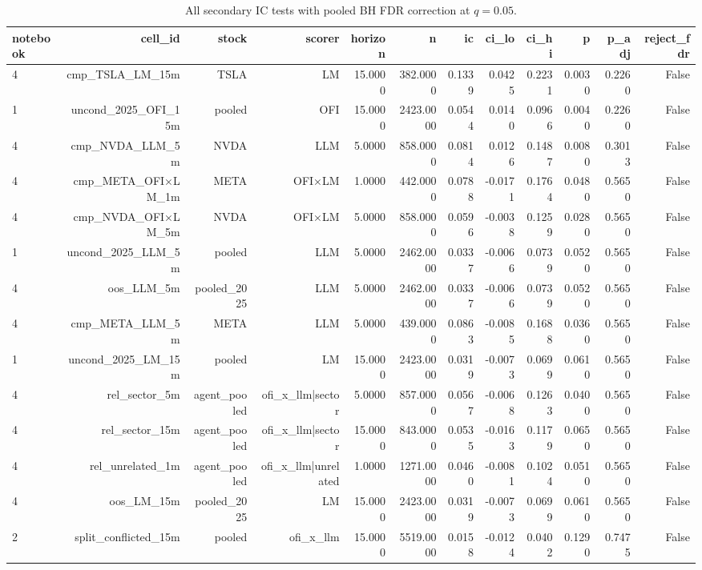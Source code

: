 \begin{table}[htbp]
\centering
\caption{All secondary IC tests with pooled BH FDR correction at $q=0.05$.}
\label{tab:secondary_fdr}
\begin{tabular}{lrrrrrrrrrrr}
\toprule
notebook & cell\_id & stock & scorer & horizon & n & ic & ci\_lo & ci\_hi & p & p\_adj & reject\_fdr \\
\midrule
4 & cmp\_TSLA\_LM\_15m & TSLA & LM & 15.0000 & 382.0000 & 0.1339 & 0.0425 & 0.2231 & 0.0030 & 0.2260 & False \\
1 & uncond\_2025\_OFI\_15m & pooled & OFI & 15.0000 & 2423.0000 & 0.0544 & 0.0140 & 0.0966 & 0.0040 & 0.2260 & False \\
4 & cmp\_NVDA\_LLM\_5m & NVDA & LLM & 5.0000 & 858.0000 & 0.0814 & 0.0126 & 0.1487 & 0.0080 & 0.3013 & False \\
4 & cmp\_META\_OFI×LM\_1m & META & OFI×LM & 1.0000 & 442.0000 & 0.0788 & -0.0171 & 0.1764 & 0.0480 & 0.5650 & False \\
4 & cmp\_NVDA\_OFI×LM\_5m & NVDA & OFI×LM & 5.0000 & 858.0000 & 0.0596 & -0.0038 & 0.1259 & 0.0280 & 0.5650 & False \\
1 & uncond\_2025\_LLM\_5m & pooled & LLM & 5.0000 & 2462.0000 & 0.0337 & -0.0066 & 0.0739 & 0.0520 & 0.5650 & False \\
4 & oos\_LLM\_5m & pooled\_2025 & LLM & 5.0000 & 2462.0000 & 0.0337 & -0.0066 & 0.0739 & 0.0520 & 0.5650 & False \\
4 & cmp\_META\_LLM\_5m & META & LLM & 5.0000 & 439.0000 & 0.0863 & -0.0085 & 0.1688 & 0.0360 & 0.5650 & False \\
1 & uncond\_2025\_LM\_15m & pooled & LM & 15.0000 & 2423.0000 & 0.0319 & -0.0073 & 0.0699 & 0.0610 & 0.5650 & False \\
4 & rel\_sector\_5m & agent\_pooled & ofi\_x\_llm|sector & 5.0000 & 857.0000 & 0.0567 & -0.0068 & 0.1263 & 0.0400 & 0.5650 & False \\
4 & rel\_sector\_15m & agent\_pooled & ofi\_x\_llm|sector & 15.0000 & 843.0000 & 0.0535 & -0.0163 & 0.1179 & 0.0650 & 0.5650 & False \\
4 & rel\_unrelated\_1m & agent\_pooled & ofi\_x\_llm|unrelated & 1.0000 & 1271.0000 & 0.0460 & -0.0081 & 0.1024 & 0.0510 & 0.5650 & False \\
4 & oos\_LM\_15m & pooled\_2025 & LM & 15.0000 & 2423.0000 & 0.0319 & -0.0073 & 0.0699 & 0.0610 & 0.5650 & False \\
2 & split\_conflicted\_15m & pooled & ofi\_x\_llm & 15.0000 & 5519.0000 & 0.0158 & -0.0124 & 0.0402 & 0.1290 & 0.7475 & False \\

\end{tabular}
\end{table}

